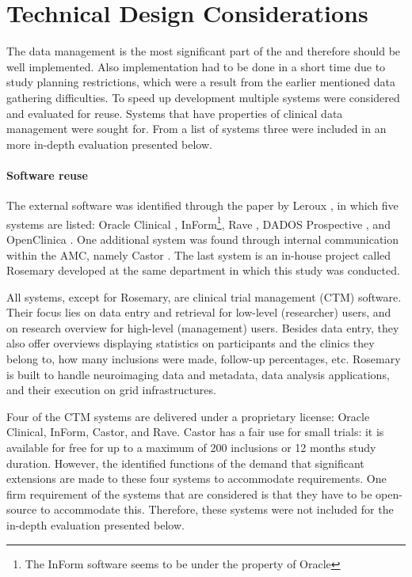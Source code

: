 \section{Technical Design Considerations}
\label{reuse}

The data management is the most significant part of the \ivfsystem{} and therefore should be well implemented.
Also implementation had to be done in a short time due to study planning restrictions, which were a result from the earlier mentioned data gathering difficulties.
To speed up development multiple systems were considered and evaluated for reuse.
Systems that have properties of clinical data management were sought for.
From a list of systems three were included in an more in-depth evaluation presented below.

\paragraph{Software reuse}
The external software was identified through the paper by Leroux \cite{leroux2011}, in which five systems are listed: Oracle Clinical \cite{oracle}, InForm\footnote{The InForm software seems to be under the property of Oracle}, Rave \cite{rave}, DADOS Prospective \cite{dados}, and OpenClinica \cite{openclinica}.
One additional system was found through internal communication within the AMC, namely Castor \cite{castor}.
The last system is an in-house project called Rosemary \cite{rosemary} developed at the same department in which this study was conducted.

All systems, except for Rosemary, are clinical trial management (CTM) software.
Their focus lies on data entry and retrieval for low-level (researcher) users, and on research overview for high-level (management) users.
Besides data entry, they also offer overviews displaying statistics on participants and the clinics they belong to, how many inclusions were made, follow-up percentages, etc.
Rosemary is built to handle neuroimaging data and metadata, data analysis applications, and their execution on grid infrastructures.

Four of the CTM systems are delivered under a proprietary license: Oracle Clinical, InForm, Castor, and Rave.
Castor has a fair use for small trials: it is available for free for up to a maximum of 200 inclusions or 12 months study duration.
However, the identified functions of the \ivfsystem{} demand that significant extensions are made to these four systems to accommodate requirements.
One firm requirement of the systems that are considered is that they have to be open-source to accommodate this.
Therefore, these systems were not included for the in-depth evaluation presented below.

